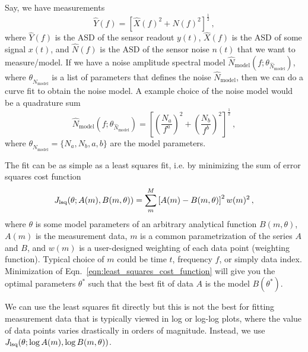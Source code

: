 Say, we have measurements
\begin{equation}
	\hat{Y}(f) = \left[\hat{X}(f)^2 + \hat{N}(f)^2\right]^{\frac{1}{2}}\,,
	\label{eqn:sensor_measurement}
\end{equation}
where $\hat{Y}(f)$ is the ASD of the sensor readout $y(t)$, $\hat{X}(f)$ is the ASD of some signal $x(t)$, and $\hat{N}(f)$ is the ASD of the sensor noise $n(t)$ that we want to measure/model.
If we have a noise amplitude spectral model $\hat{N}_\mathrm{model}(f;\theta_{\hat{N}_\mathrm{model}})$, where $\theta_{\hat{N}_\mathrm{model}}$ is a list of parameters that defines the noise $\hat{N}_\mathrm{model}$, then we can do a curve fit to obtain the noise model.
A example choice of the noise model would be a quadrature sum
\begin{equation}
	\hat{N}_\mathrm{model}(f;\theta_{\hat{N}_\mathrm{model}})=\left[\left(\frac{N_a}{f^a}\right)^2 + \left(\frac{N_b}{f^b}\right)^2\right]^{\frac{1}{2}}\,,
	\label{eqn:noise_model}
\end{equation}
where $\theta_{\hat{N}_\mathrm{model}}=\{N_a,N_b,a,b\}$ are the model parameters.

The fit can be as simple as a least squares fit, i.e. by minimizing the sum of error squares cost function
\begin{equation}
	J_\mathrm{lsq}\mleft(\theta;A(m), B(m,\theta)\mright) = \sum_m^M\left[A(m)-B(m,\theta)\right]^2 w(m)^2\,,
	\label{eqn:least_squares_cost_function}
\end{equation}
where $\theta$ is some model parameters of an arbitrary analytical function $B(m,\theta)$, $A(m)$ is the measurement data, $m$ is a common parametrization of the series $A$ and $B$, and $w(m)$ is a user-designed weighting of each data point (weighting function).
Typical choice of $m$ could be time $t$, frequency $f$, or simply data index.
Minimization of Eqn.~\eqref{eqn:least_squares_cost_function} will give you the optimal parameters $\theta^*$ such that the best fit of data $A$ is the model $B(\theta^*)$.

We can use the least squares fit directly but this is not the best for fitting measurement data that is typically viewed in log or log-log plots, where the value of data points varies drastically in orders of magnitude.
Instead, we use $J_\mathrm{lsq}\mleft(\theta;\log{A(m)}, \log{B(m,\theta)}\mright)$.

